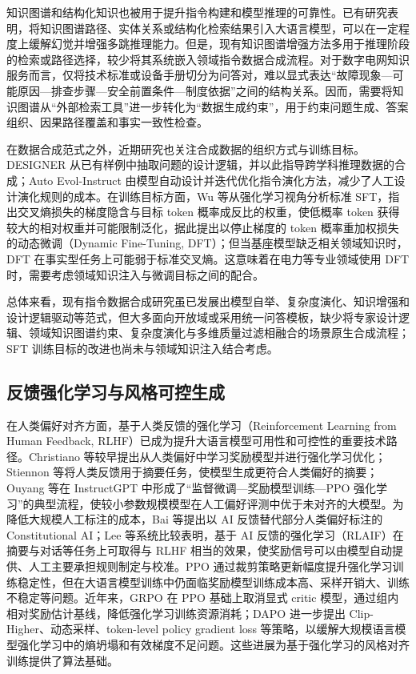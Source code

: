 \documentclass[fontset=fandol,type=master,campus=shenzhen,etitleauto=true]{hithesisbook}
\begin{document}
知识图谱和结构化知识也被用于提升指令构建和模型推理的可靠性。已有研究表明，将知识图谱路径、实体关系或结构化检索结果引入大语言模型，可以在一定程度上缓解幻觉并增强多跳推理能力\cite{ref15,ref16}。但是，现有知识图谱增强方法多用于推理阶段的检索或路径选择，较少将其系统嵌入领域指令数据合成流程。对于数字电网知识服务而言，仅将技术标准或设备手册切分为问答对，难以显式表达“故障现象—可能原因—排查步骤—安全前置条件—制度依据”之间的结构关系。因而，需要将知识图谱从“外部检索工具”进一步转化为“数据生成约束”，用于约束问题生成、答案组织、因果路径覆盖和事实一致性检查。

在数据合成范式之外，近期研究也关注合成数据的组织方式与训练目标。DESIGNER 从已有样例中抽取问题的设计逻辑，并以此指导跨学科推理数据的合成\cite{ref54}；Auto Evol-Instruct 由模型自动设计并迭代优化指令演化方法，减少了人工设计演化规则的成本\cite{ref53}。在训练目标方面，Wu 等从强化学习视角分析标准 SFT，指出交叉熵损失的梯度隐含与目标 token 概率成反比的权重，使低概率 token 获得较大的相对权重并可能限制泛化，据此提出以停止梯度的 token 概率重加权损失的动态微调（Dynamic Fine-Tuning, DFT）；但当基座模型缺乏相关领域知识时，DFT 在事实型任务上可能弱于标准交叉熵\cite{ref82}。这意味着在电力等专业领域使用 DFT 时，需要考虑领域知识注入与微调目标之间的配合。

总体来看，现有指令数据合成研究虽已发展出模型自举、复杂度演化、知识增强和设计逻辑驱动等范式，但大多面向开放域或采用统一问答模板，缺少将专家设计逻辑、领域知识图谱约束、复杂度演化与多维质量过滤相融合的场景原生合成流程；SFT 训练目标的改进也尚未与领域知识注入结合考虑。

\subsection{反馈强化学习与风格可控生成}

在人类偏好对齐方面，基于人类反馈的强化学习（Reinforcement Learning from Human Feedback, RLHF）已成为提升大语言模型可用性和可控性的重要技术路径。Christiano 等较早提出从人类偏好中学习奖励模型并进行强化学习优化\cite{ref30}；Stiennon 等将人类反馈用于摘要任务，使模型生成更符合人类偏好的摘要\cite{ref31}；Ouyang 等在 InstructGPT 中形成了“监督微调—奖励模型训练—PPO 强化学习”的典型流程，使较小参数规模模型在人工偏好评测中优于未对齐的大模型\cite{ref32}。为降低大规模人工标注的成本，Bai 等提出以 AI 反馈替代部分人类偏好标注的 Constitutional AI\cite{ref44}；Lee 等系统比较表明，基于 AI 反馈的强化学习（RLAIF）在摘要与对话等任务上可取得与 RLHF 相当的效果\cite{ref90}，使奖励信号可以由模型自动提供、人工主要承担规则制定与校准。PPO 通过裁剪策略更新幅度提升强化学习训练稳定性\cite{ref33}，但在大语言模型训练中仍面临奖励模型训练成本高、采样开销大、训练不稳定等问题。近年来，GRPO 在 PPO 基础上取消显式 critic 模型，通过组内相对奖励估计基线，降低强化学习训练资源消耗\cite{ref34}；DAPO 进一步提出 Clip-Higher、动态采样、token-level policy gradient loss 等策略，以缓解大规模语言模型强化学习中的熵坍塌和有效梯度不足问题\cite{ref35}。这些进展为基于强化学习的风格对齐训练提供了算法基础。
\end{document}
